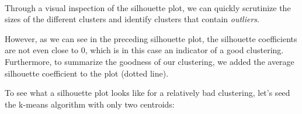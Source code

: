 \documentclass[11pt]{article}
\begin{document}
    \begin{center}
    \end{center}
    { \hspace*{\fill} \\}
    
    Through a visual inspection of the silhouette plot, we can quickly
scrutinize the sizes of the different clusters and identify clusters
that contain \emph{outliers}.

However, as we can see in the preceding silhouette plot, the silhouette
coefficients are not even close to 0, which is in this case an indicator
of a good clustering. Furthermore, to summarize the goodness of our
clustering, we added the average silhouette coefficient to the plot
(dotted line).

To see what a silhouette plot looks like for a relatively bad
clustering, let's seed the k-means algorithm with only two centroids:
\end{document}
